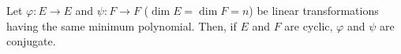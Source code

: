 Let $\varphi: E \to E$ and $\psi: F \to F$ ($\dim E = \dim F = n$) be linear transformations having the same minimum polynomial. Then, if $E$ and $F$ are cyclic, $\varphi$ and $\psi$ are conjugate.
